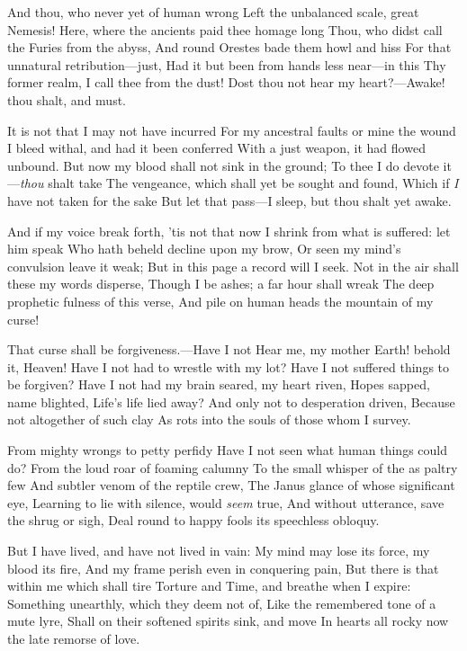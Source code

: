 \documentclass[10pt,twocolumn]{book}
\begin{document}
   And thou, who never yet of human wrong
   Left the unbalanced scale, great Nemesis!
   Here, where the ancients paid thee homage long\textemdash
   Thou, who didst call the Furies from the abyss,
   And round Orestes bade them howl and hiss
   For that unnatural retribution---just,
   Had it but been from hands less near---in this
   Thy former realm, I call thee from the dust!
Dost thou not hear my heart?---Awake! thou shalt, and must.


   It is not that I may not have incurred
   For my ancestral faults or mine the wound
   I bleed withal, and had it been conferred
   With a just weapon, it had flowed unbound.
   But now my blood shall not sink in the ground;
   To thee I do devote it---\textit{thou} shalt take
   The vengeance, which shall yet be sought and found,
   Which if \textit{I} have not taken for the sake\textemdash
But let that pass---I sleep, but thou shalt yet awake.


   And if my voice break forth, 'tis not that now
   I shrink from what is suffered:  let him speak
   Who hath beheld decline upon my brow,
   Or seen my mind's convulsion leave it weak;
   But in this page a record will I seek.
   Not in the air shall these my words disperse,
   Though I be ashes; a far hour shall wreak
   The deep prophetic fulness of this verse,
And pile on human heads the mountain of my curse!


   That curse shall be forgiveness.---Have I not\textemdash
   Hear me, my mother Earth! behold it, Heaven!\textemdash
   Have I not had to wrestle with my lot?
   Have I not suffered things to be forgiven?
   Have I not had my brain seared, my heart riven,
   Hopes sapped, name blighted, Life's life lied away?
   And only not to desperation driven,
   Because not altogether of such clay
As rots into the souls of those whom I survey.


   From mighty wrongs to petty perfidy
   Have I not seen what human things could do?
   From the loud roar of foaming calumny
   To the small whisper of the as paltry few
   And subtler venom of the reptile crew,
   The Janus glance of whose significant eye,
   Learning to lie with silence, would \textit{seem} true,
   And without utterance, save the shrug or sigh,
Deal round to happy fools its speechless obloquy.


   But I have lived, and have not lived in vain:
   My mind may lose its force, my blood its fire,
   And my frame perish even in conquering pain,
   But there is that within me which shall tire
   Torture and Time, and breathe when I expire:
   Something unearthly, which they deem not of,
   Like the remembered tone of a mute lyre,
   Shall on their softened spirits sink, and move
In hearts all rocky now the late remorse of love.
\end{document}
